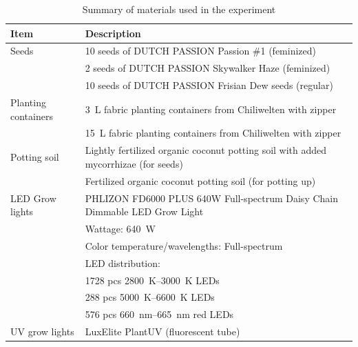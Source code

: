 \begin{table}[htbp]
    \caption{Summary of materials used in the experiment}
    \label{tab:materials}
    \begin{tabularx}{\linewidth}{l|X}
        \toprule
        \textbf{Item} & \textbf{Description} \\
        \midrule
        Seeds\index{seeds!cannabis} & 10 seeds of DUTCH PASSION Passion \#1\index{seeds!cannabis!Passion \#1} (feminized) \\
        & 2 seeds of DUTCH PASSION Skywalker Haze\index{seeds!cannabis!Skywalker Haze} (feminized) \\
        & 10 seeds of DUTCH PASSION Frisian Dew seeds\index{seeds!cannabis!Frisian Dew} (regular) \\
        \bigstrut
        Planting containers\index{planting container} & \qty[mode=text]{3}{\L} fabric planting containers from Chiliwelten with zipper \\
        & \qty[mode=text]{15}{\L} fabric planting containers from Chiliwelten with zipper \\
        \bigstrut
        Potting soil\index{potting soil} & Lightly fertilized organic coconut potting soil with added mycorrhizae\index{mycorrhizae} (for seeds) \\
        & Fertilized organic coconut potting soil (for potting up) \\
        \bigstrut
        LED Grow lights\index{grow light!LED} & PHLIZON FD6000 PLUS 640W Full-spectrum Daisy Chain Dimmable LED Grow Light\index{grow light!LED!PHLIZON FD6000 PLUS 640W Full-spectrum} \\
        & \quad Wattage: \qty[mode=text]{640}{\W} \\
        & \quad Color temperature/wavelengths: Full-spectrum \\
        & \quad LED distribution: \\
        & \quad \quad \num[mode=text]{1728} pcs \qtyrange[mode=text, range-phrase=\textendash, range-units=single]{2800}{3000}{\K} LEDs \\
        & \quad \quad \num[mode=text]{288} pcs \qtyrange[mode=text, range-phrase=\textendash, range-units=single]{5000}{6600}{\K} LEDs \\
        & \quad \quad \num[mode=text]{576} pcs \qtyrange[mode=text, range-phrase=\textendash, range-units=single]{660}{665}{\nm} red LEDs \\
        \bigstrut
        UV grow lights\index{grow light!UV} & LuxElite PlantUV (fluorescent tube)\index{grow light!UV!LuxElite PlantUV} \\

\end{tabularx}
\end{table}
